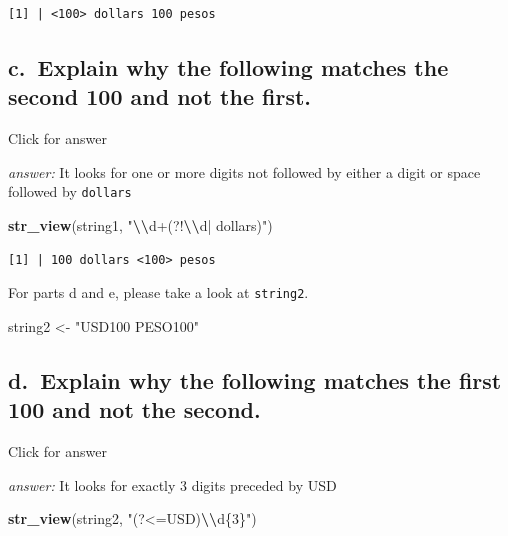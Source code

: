 \documentclass[
]{book}
\newenvironment{Shaded}{\begin{snugshade}}{\end{snugshade}}
\newcommand{\FunctionTok}[1]{\textcolor[rgb]{0.13,0.29,0.53}{\textbf{#1}}}
\newcommand{\NormalTok}[1]{#1}
\newcommand{\OtherTok}[1]{\textcolor[rgb]{0.56,0.35,0.01}{#1}}
\newcommand{\SpecialCharTok}[1]{\textcolor[rgb]{0.81,0.36,0.00}{\textbf{#1}}}
\newcommand{\StringTok}[1]{\textcolor[rgb]{0.31,0.60,0.02}{#1}}
\begin{document}
\begin{verbatim}
[1] | <100> dollars 100 pesos
\end{verbatim}

\hypertarget{c.-explain-why-the-following-matches-the-second-100-and-not-the-first.}{%
\subsection{c.~Explain why the following matches the second 100 and not the first.}\label{c.-explain-why-the-following-matches-the-second-100-and-not-the-first.}}

Click for answer

\emph{answer:} It looks for one or more digits not followed by either a digit or space followed by \texttt{dollars}

\begin{Shaded}
\begin{Highlighting}[]
\FunctionTok{str\_view}\NormalTok{(string1, }\StringTok{"}\SpecialCharTok{\textbackslash{}\textbackslash{}}\StringTok{d+(?!}\SpecialCharTok{\textbackslash{}\textbackslash{}}\StringTok{d| dollars)"}\NormalTok{)}
\end{Highlighting}
\end{Shaded}

\begin{verbatim}
[1] | 100 dollars <100> pesos
\end{verbatim}

For parts d and e, please take a look at \texttt{string2}.

\begin{Shaded}
\begin{Highlighting}[]
\NormalTok{string2 }\OtherTok{\textless{}{-}} \StringTok{"USD100 PESO100"}
\end{Highlighting}
\end{Shaded}

\hypertarget{d.-explain-why-the-following-matches-the-first-100-and-not-the-second.}{%
\subsection{d.~Explain why the following matches the first 100 and not the second.}\label{d.-explain-why-the-following-matches-the-first-100-and-not-the-second.}}

Click for answer

\emph{answer:} It looks for exactly 3 digits preceded by USD

\begin{Shaded}
\begin{Highlighting}[]
\FunctionTok{str\_view}\NormalTok{(string2, }\StringTok{"(?\textless{}=USD)}\SpecialCharTok{\textbackslash{}\textbackslash{}}\StringTok{d\{3\}"}\NormalTok{)}
\end{Highlighting}
\end{Shaded}
\end{document}
